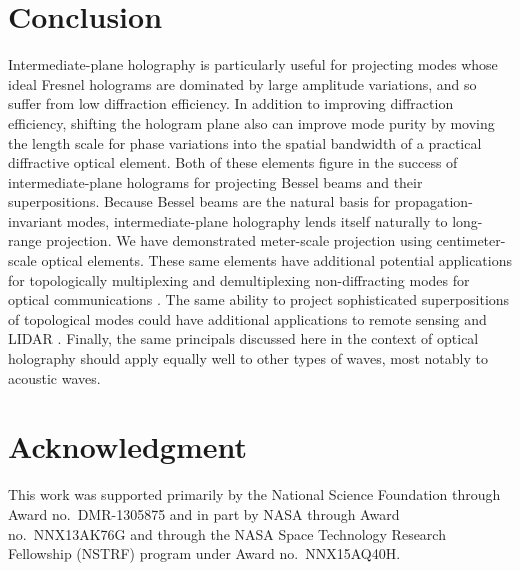 \section{Conclusion}

Intermediate-plane holography is particularly useful for projecting
modes whose ideal Fresnel holograms are dominated by large
amplitude variations, and so suffer from low diffraction efficiency.
In addition to improving diffraction efficiency, shifting the
hologram plane also can improve mode purity by moving the
length scale for phase variations into the spatial bandwidth of a
practical diffractive optical element.
Both of these elements figure in the success of intermediate-plane
holograms for projecting Bessel beams and their superpositions.
Because Bessel beams are the natural basis for propagation-invariant
modes, intermediate-plane holography lends itself naturally
to long-range projection.
We have demonstrated meter-scale projection using centimeter-scale
optical elements.
These same elements have additional potential applications for
topologically multiplexing and demultiplexing non-diffracting modes
for optical communications \cite{gibson04,bozinovic13,willner15}.
The same ability to project sophisticated superpositions of
topological modes could have additional applications to remote
sensing and LIDAR \cite{cvijetic15}.
Finally, the same principals discussed here in the context of
optical holography should apply equally well to other types
of waves, most notably to acoustic waves.


\section{Acknowledgment}
This work was supported primarily by the National Science Foundation
through Award no.\ DMR-1305875 and in part by NASA through
Award no.\ NNX13AK76G and through the NASA Space Technology Research
Fellowship (NSTRF) program under Award no.\ NNX15AQ40H.



